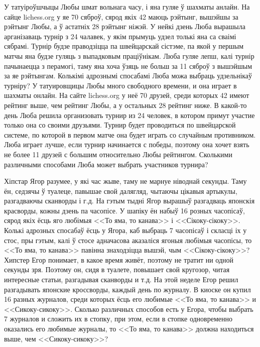 \documentclass[11pt, a4paper]{article}
\begin{document}
\begin{problemList}
\medskip

\problemItemSimple
{У татуіроўшчыцы Любы шмат вольнага часу, і яна гуляе ў шахматы анлайн.
На сайце lichess.org у яе 70 сяброў, сярод якіх 42 маюць рэйтынг, вышэйшы за рэйтынг Любы, а ў астатніх 28 рэйтынг ніжэй.
У нейкі дзень Люба вырашыла арганізаваць турнір з 24 чалавек, у якім прымуць удзел толькі яна са сваімі сябрамі.
Турнір будзе праводзіцца па швейцарскай сістэме, па якой у першым матчы яна будзе гуляць з выпадковым праціўнікам.
Люба гуляе лепш, калі турнір пачынаецца з перамогі, таму яна хоча ўзяць не больш за 11 сяброў з вышэйшым за яе рэйтынгам.
Колькімі адрознымі спосабамі Люба можа выбраць удзельнікаў турніру?}
{У татуировщицы Любы много свободного времени, и она играет в шахматы онлайн.
На сайте lichess.org у неё 70 друзей, среди которых 42 имеют рейтинг выше, чем рейтинг Любы, а у остальных 28 рейтинг ниже.
В какой-то день Люба решила организовать турнир из 24 человек, в котором примут участие только она со своими друзьями.
Турнир будет проводиться по швейцарской системе, по которой в первом матче она будет играть со случайным противником.
Люба играет лучше, если турнир начинается с победы, поэтому она хочет взять не более 11 друзей с большим относительно Любы рейтингом.
Сколькими различными способами Люба может выбрать участников турнира?}

\medskip

\problemItemSimple
{Хіпстар Ягор разумее, у які час жыве, таму не марнуе ніводнай секунды.
Таму ён, седзячы ў туалеце, павышае свой далягляд, чытаючы цікавыя артыкулы, разгадваючы сканворды і г.д.
На гэтым тыдні Ягор вырашыў разгадваць японскія красворды, кожны дзень па часопісе.
У шапіку ён набыў 16 розных часопісаў, сярод якіх ёсць яго любімыя <<То яма, то канава>> і <<Сікоку-сікоку>>.
Колькі адрозных спосабаў ёсць у Ягора, каб выбраць 7 часопісаў і скласці іх у стос, пры гэтым, калі ў стосе адначасова аказаліся ягоныя любімыя часопісы, то <<То яма, то канава>> павінна знаходзіцца вышэй, чым <<Сікоку-сікоку>>?}
{Хипстер Егор понимает, в какое время живёт, поэтому не тратит ни одной секунды зря.
Поэтому он, сидя в туалете, повышает свой кругозор, читая интересные статьи, разгадывая сканворды и т.д.
На этой неделе Егор решил разгадывать японские кроссворды, каждый день по журналу.
В киоске он купил 16 разных журналов, среди которых ёсць его любимые <<То яма, то канава>> и <<Сикоку-сикоку>>.
Сколько различных способов есть у Егора, чтобы выбрать 7 журналов и сложить их в стопку, при этом,
если в стопке одновременно оказались его любимые журналы, то <<То яма, то канава>> должна находиться выше, чем <<Сикоку-сикоку>>?}


\end{problemList}
\end{document}
